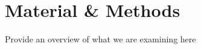 \documentclass{frontiersSCNS} %
\begin{document}




\section{Material \& Methods}
Provide an overview of what we are examining here
\end{document}
